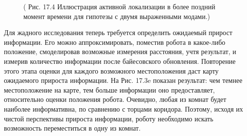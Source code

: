\documentclass[10pt,a4paper]{article}
\begin{document}
\begin{figure}[H]
	\caption{ ( Рис. 17.4 Иллюстрация активной локализации в более поздний момент времени для гипотезы с двумя выраженными модами.) }
	\label{fig:174orig}
\end{figure}

Для жадного исследования теперь требуется определить ожидаемый прирост информации. Его можно аппроксимировать, поместив робота в какое-либо положение, смоделировав возможные измерения расстояния, учтя результат, и измерив количество информации после байесовского обновления. Повторение этого этапа оценки для каждого возможного местоположения даст карту ожидаемого прироста информации. На Рис. 17.3e показан результат: чем темнее местоположение на карте, тем больше информации оно предоставляет, относительно оценки положения робота. Очевидно, любая из комнат будет наиболее информативна, по сравнению с торцами коридора. Поэтому, исходя их чистой перспективы прироста информации, роботу необходимо искать возможность переместиться в одну из комнат.
\end{document}
